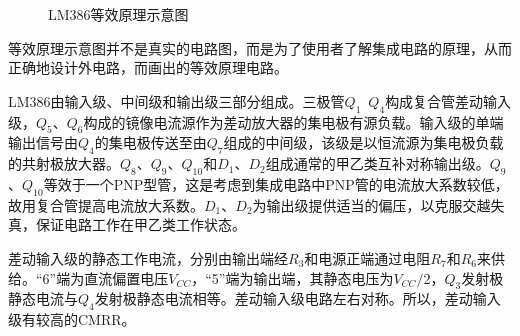 \documentclass[a4paper]{article}
\begin{document}
\begin{enumerate}
\begin{figure}[!h]
\caption{LM386等效原理示意图}\label{cd2}
\end{figure}
等效原理示意图并不是真实的电路图，而是为了使用者了解集成电路的原理，从而正确地设计外电路，而画出的等效原理电路。

LM386由输入级、中间级和输出级三部分组成。三极管$Q_1$~$Q_4$构成复合管差动输入级，$Q_5$、$Q_6$构成的镜像电流源作为差动放大器的集电极有源负载。输入级的单端输出信号由$Q_4$的集电极传送至由$Q_7$组成的中间级，该级是以恒流源为集电极负载的共射极放大器。$Q_8$、$Q_9$、$Q_{10}$和$D_1$、$D_2$组成通常的甲乙类互补对称输出级。$Q_9$、$Q_{10}$等效于一个PNP型管，这是考虑到集成电路中PNP管的电流放大系数较低，故用复合管提高电流放大系数。$D_1$、$D_2$为输出级提供适当的偏压，以克服交越失真，保证电路工作在甲乙类工作状态。

差动输入级的静态工作电流，分别由输出端经$R_3$和电源正端通过电阻$R_7$和$R_6$来供给。“6”端为直流偏置电压$V_{CC}$，“5”端为输出端，其静态电压为$V_{CC}/2$，$Q_3$发射极静态电流与$Q_4$发射极静态电流相等。差动输入级电路左右对称。所以，差动输入级有较高的CMRR。


\end{enumerate}
\end{document}
